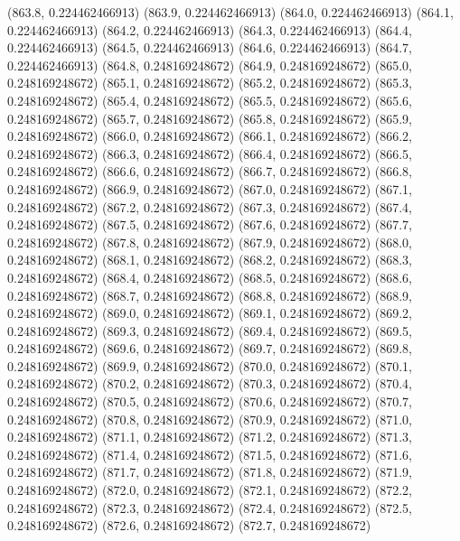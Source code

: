 {					(863.8, 0.224462466913)
					(863.9, 0.224462466913)
					(864.0, 0.224462466913)
					(864.1, 0.224462466913)
					(864.2, 0.224462466913)
					(864.3, 0.224462466913)
					(864.4, 0.224462466913)
					(864.5, 0.224462466913)
					(864.6, 0.224462466913)
					(864.7, 0.224462466913)
					(864.8, 0.248169248672)
					(864.9, 0.248169248672)
					(865.0, 0.248169248672)
					(865.1, 0.248169248672)
					(865.2, 0.248169248672)
					(865.3, 0.248169248672)
					(865.4, 0.248169248672)
					(865.5, 0.248169248672)
					(865.6, 0.248169248672)
					(865.7, 0.248169248672)
					(865.8, 0.248169248672)
					(865.9, 0.248169248672)
					(866.0, 0.248169248672)
					(866.1, 0.248169248672)
					(866.2, 0.248169248672)
					(866.3, 0.248169248672)
					(866.4, 0.248169248672)
					(866.5, 0.248169248672)
					(866.6, 0.248169248672)
					(866.7, 0.248169248672)
					(866.8, 0.248169248672)
					(866.9, 0.248169248672)
					(867.0, 0.248169248672)
					(867.1, 0.248169248672)
					(867.2, 0.248169248672)
					(867.3, 0.248169248672)
					(867.4, 0.248169248672)
					(867.5, 0.248169248672)
					(867.6, 0.248169248672)
					(867.7, 0.248169248672)
					(867.8, 0.248169248672)
					(867.9, 0.248169248672)
					(868.0, 0.248169248672)
					(868.1, 0.248169248672)
					(868.2, 0.248169248672)
					(868.3, 0.248169248672)
					(868.4, 0.248169248672)
					(868.5, 0.248169248672)
					(868.6, 0.248169248672)
					(868.7, 0.248169248672)
					(868.8, 0.248169248672)
					(868.9, 0.248169248672)
					(869.0, 0.248169248672)
					(869.1, 0.248169248672)
					(869.2, 0.248169248672)
					(869.3, 0.248169248672)
					(869.4, 0.248169248672)
					(869.5, 0.248169248672)
					(869.6, 0.248169248672)
					(869.7, 0.248169248672)
					(869.8, 0.248169248672)
					(869.9, 0.248169248672)
					(870.0, 0.248169248672)
					(870.1, 0.248169248672)
					(870.2, 0.248169248672)
					(870.3, 0.248169248672)
					(870.4, 0.248169248672)
					(870.5, 0.248169248672)
					(870.6, 0.248169248672)
					(870.7, 0.248169248672)
					(870.8, 0.248169248672)
					(870.9, 0.248169248672)
					(871.0, 0.248169248672)
					(871.1, 0.248169248672)
					(871.2, 0.248169248672)
					(871.3, 0.248169248672)
					(871.4, 0.248169248672)
					(871.5, 0.248169248672)
					(871.6, 0.248169248672)
					(871.7, 0.248169248672)
					(871.8, 0.248169248672)
					(871.9, 0.248169248672)
					(872.0, 0.248169248672)
					(872.1, 0.248169248672)
					(872.2, 0.248169248672)
					(872.3, 0.248169248672)
					(872.4, 0.248169248672)
					(872.5, 0.248169248672)
					(872.6, 0.248169248672)
					(872.7, 0.248169248672)
}

